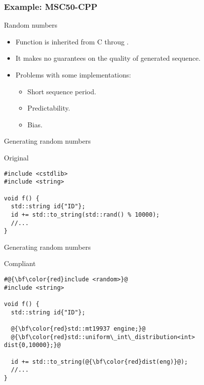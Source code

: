 \subsubsection{Example: MSC50-CPP}

\begin{frame}[t]{Random numbers}
\begin{itemize}
  \item Function  is inherited from C throug .

  \vfill
  \item It makes no guarantees on the quality of generated sequence.

  \vfill
  \item Problems with some implementations:
    \begin{itemize}
      \item Short sequence period.
      \item Predictability.
      \item Bias.
    \end{itemize}
\end{itemize}
\end{frame}

\begin{frame}[t,fragile]{Generating random numbers}
\begin{block}{Original}
\begin{lstlisting}
#include <cstdlib>
#include <string>

void f() {
  std::string id{"ID"};
  id += std::to_string(std::rand() % 10000);
  //...
}
\end{lstlisting}
\end{block}
\end{frame}

\begin{frame}[t,fragile]{Generating random numbers}
\begin{block}{Compliant}
\begin{lstlisting}[escapechar=@]
#@{\bf\color{red}include <random>}@
#include <string>

void f() {
  std::string id{"ID"};

  @{\bf\color{red}std::mt19937 engine;}@
  @{\bf\color{red}std::uniform\_int\_distribution<int> dist{0,10000};}@

  id += std::to_string(@{\bf\color{red}dist(eng)}@);
  //...
}

\end{lstlisting}
\end{block}
\end{frame}

